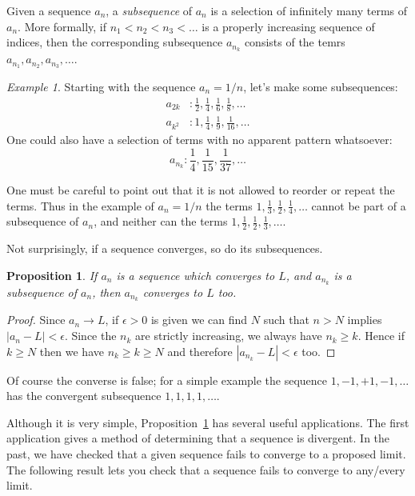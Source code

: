 \documentclass[11pt,oneside]{amsbook}
\theoremstyle{definition}
\theoremstyle{plain}
\newtheorem{proposition}[theorem]{Proposition}
\theoremstyle{definition}
\theoremstyle{remark}
\newtheorem{example}[theorem]{Example}
\numberwithin{equation}{section}
\numberwithin{figure}{section}
\begin{document}
Given a sequence $a_n$, a \emph{subsequence} of $a_n$ is a selection of infinitely many terms of $a_n$. More formally, if $n_1<n_2<n_3<\ldots$ is a properly increasing sequence of indices, then the corresponding subsequence $a_{n_k}$ consists of the temrs $a_{n_1},a_{n_2},a_{n_3},\ldots$.

\begin{example}
  Starting with the sequence $a_n=1/n$, let's make some subsequences:
  \begin{align*}
    a_{2k}&: \frac12, \frac14, \frac16, \frac18, \ldots\\
    a_{k^2}&: 1, \frac14, \frac19, \frac1{16}, \ldots
  \end{align*}
  One could also have a selection of terms with no apparent pattern whatsoever:
  \[a_{n_k}:\frac14, \frac{1}{15}, \frac{1}{37},\ldots
  \]
\end{example}

One must be careful to point out that it is not allowed to reorder or repeat the terms. Thus in the example of $a_n=1/n$ the terms $1,\frac13,\frac12,\frac14,\ldots$ cannot be part of a subsequence of $a_n$, and neither can the terms $1,\frac12,\frac12,\frac13,\ldots$.

Not surprisingly, if a sequence converges, so do its subsequences.

\begin{proposition}
  \label{prop:subsequence}
  If $a_n$ is a sequence which converges to $L$, and $a_{n_k}$ is a subsequence of $a_n$, then $a_{n_k}$ converges to $L$ too.
\end{proposition}

\begin{proof}
  Since $a_n\to L$, if $\epsilon>0$ is given we can find $N$ such that $n>N$ implies $|a_n-L|<\epsilon$. Since the $n_k$ are strictly increasing, we always have $n_k\geq k$. Hence if $k\geq N$ then we have $n_k\geq k\geq N$ and therefore $|a_{n_k}-L|<\epsilon$ too.
\end{proof}

Of course the converse is false; for a simple example the sequence $1,-1,+1,-1,\ldots$ has the convergent subsequence $1,1,1,1,\ldots$.

Although it is very simple, Proposition~\ref{prop:subsequence} has several useful applications. The first application gives a method of determining that a sequence is divergent. In the past, we have checked that a given sequence fails to converge to a proposed limit. The following result lets you check that a sequence fails to converge to any/every limit.
\end{document}

